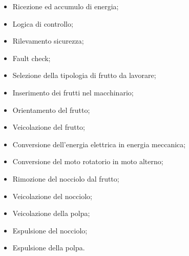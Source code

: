 \documentclass[12pt,a4paper,twoside]{report}  %
\begin{document}
\begin{itemize}
\item Ricezione ed accumulo di energia;
\item Logica di controllo;
\item Rilevamento sicurezza;
\item Fault check;
\item Selezione della tipologia di frutto da lavorare;
\item Inserimento dei frutti nel macchinario;
\item Orientamento del frutto;
\item Veicolazione del frutto;
\item Conversione dell'energia elettrica in energia meccanica;
\item Conversione del moto rotatorio in moto alterno;
\item Rimozione del nocciolo dal frutto;
\item Veicolazione del nocciolo;
\item Veicolazione della polpa;
\item Espulsione del nocciolo;
\item Espulsione della polpa.
\end{itemize}
\end{document}
